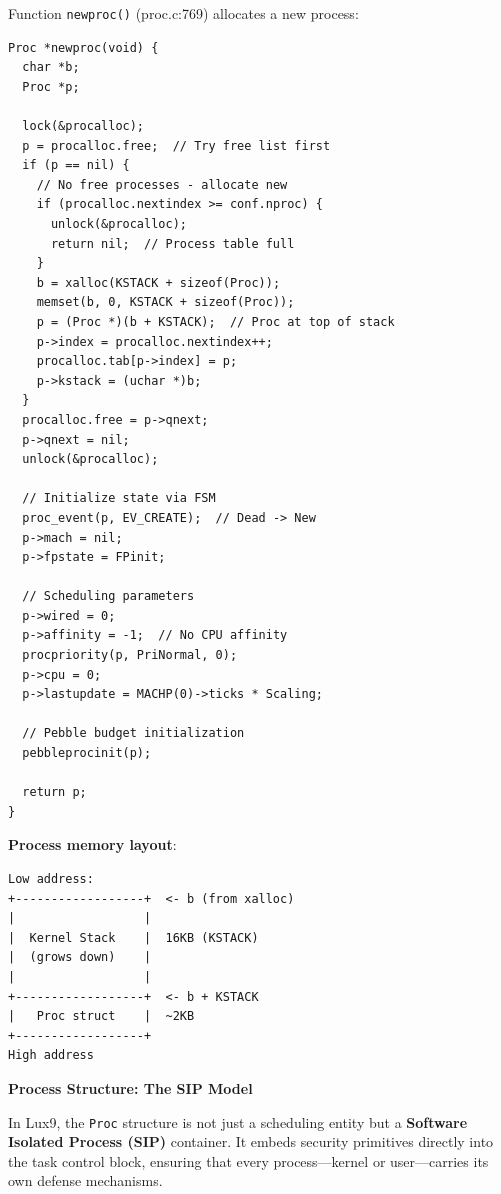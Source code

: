 \documentclass[11pt,letterpaper]{article}
\begin{document}
Function \texttt{newproc()} (proc.c:769) allocates a new process:

\begin{lstlisting}
Proc *newproc(void) {
  char *b;
  Proc *p;
  
  lock(&procalloc);
  p = procalloc.free;  // Try free list first
  if (p == nil) {
    // No free processes - allocate new
    if (procalloc.nextindex >= conf.nproc) {
      unlock(&procalloc);
      return nil;  // Process table full
    }
    b = xalloc(KSTACK + sizeof(Proc));
    memset(b, 0, KSTACK + sizeof(Proc));
    p = (Proc *)(b + KSTACK);  // Proc at top of stack
    p->index = procalloc.nextindex++;
    procalloc.tab[p->index] = p;
    p->kstack = (uchar *)b;
  }
  procalloc.free = p->qnext;
  p->qnext = nil;
  unlock(&procalloc);
  
  // Initialize state via FSM
  proc_event(p, EV_CREATE);  // Dead -> New
  p->mach = nil;
  p->fpstate = FPinit;
  
  // Scheduling parameters
  p->wired = 0;
  p->affinity = -1;  // No CPU affinity
  procpriority(p, PriNormal, 0);
  p->cpu = 0;
  p->lastupdate = MACHP(0)->ticks * Scaling;
  
  // Pebble budget initialization
  pebbleprocinit(p);
  
  return p;
}
\end{lstlisting}

\textbf{Process memory layout}:
\begin{verbatim}
Low address:
+------------------+  <- b (from xalloc)
|                  |
|  Kernel Stack    |  16KB (KSTACK)
|  (grows down)    |
|                  |
+------------------+  <- b + KSTACK
|   Proc struct    |  ~2KB
+------------------+
High address
\end{verbatim}

\textbf{Process Structure: The SIP Model}

In Lux9, the \texttt{Proc} structure is not just a scheduling entity but a \textbf{Software Isolated Process (SIP)} container. It embeds security primitives directly into the task control block, ensuring that every process—kernel or user—carries its own defense mechanisms.
\end{document}
